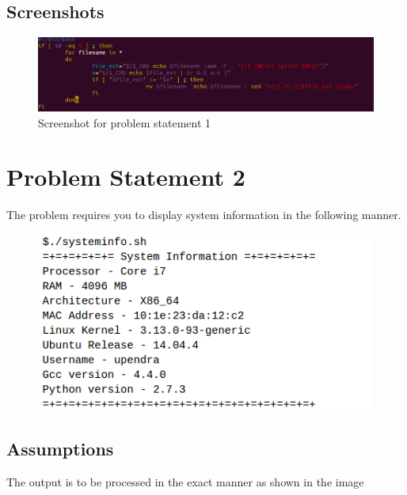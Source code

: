 \documentclass[11pt]{report}
\begin{document}
	\subsection{Screenshots}
	\begin{figure}[h!]
	\centering
	\includegraphics[scale=0.8, center]{images/screenshot1}
	\caption{Screenshot for problem statement 1}
	\end{figure}
	\pagebreak
\section{Problem Statement 2}
	The problem requires you to display system information in the following manner. \\
	\begin{figure}[h!]
	\centering
	\includegraphics[scale=0.7]{images/Selection_001}	
	\end{figure}
	\subsection{Assumptions}
	The output is to be processed in the exact manner as shown in the image
	\pagebreak
\end{document}
